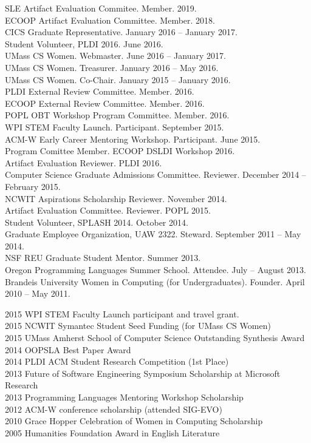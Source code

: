\documentclass[10pt]{article}
\newcommand{\cvsec}[2]{
    \begin{tcolorbox}[width=\textwidth, breakable, title={#1}]
        #2
    \end{tcolorbox}
    \vspace{10pt}
}
\begin{document}
\cvsec{Professional Activities and Service}{
  SLE Artifact Evaluation Commitee. Member. 2019.\\
  ECOOP Artifact Evaluation Committee. Member. 2018.\\
  CICS Graduate Representative. January 2016 -- January 2017.\\
  Student Volunteer, PLDI 2016. June 2016. \\
  UMass CS Women. Webmaster. June 2016 -- January 2017.\\
  UMass CS Women. Treasurer. January 2016 -- May 2016.\\
  UMass CS Women. Co-Chair. January 2015 -- January 2016.\\
  PLDI External Review Committee.  Member.  2016.\\
  ECOOP External Review Committee.  Member.  2016.\\
  POPL OBT Workshop Program Committee.  Member.  2016.\\
  WPI STEM Faculty Launch.  Participant.  September 2015.\\
  ACM-W Early Career Mentoring Workshop.  Participant.  June 2015.\\
  Program Comittee Member. ECOOP DSLDI Workshop 2016. \\
  Artifact Evaluation Reviewer. PLDI 2016. \\
  Computer Science Graduate Admissions Committee. Reviewer. December 2014 -- February 2015.\\
  NCWIT Aspirations Scholarship Reviewer. November 2014. \\
  Artifact Evaluation Committee. Reviewer. POPL 2015.\\
  Student Volunteer, SPLASH 2014. October 2014.\\
  Graduate Employee Organization, UAW 2322. Steward. September 2011 -- May 2014.\\
  NSF REU Graduate Student Mentor. Summer 2013.\\
  Oregon Programming Languages Summer School. Attendee. July -- August 2013.	\\
  Brandeis University Women in Computing (for Undergraduates). Founder. April 2010 -- May 2011. 
}


\cvsec{Honors, Scholarships, and Awards}{
  2015 WPI STEM Faculty Launch participant and travel grant.\\
  2015 NCWIT Symantec Student Seed Funding (for UMass CS Women)\\
  2015 UMass Amherst School of Computer Science Outstanding Synthesis Award\\
  2014 OOPSLA Best Paper Award\\
  2014 PLDI ACM Student Research Competition (1st Place)\\
  2013 Future of Software Engineering Symposium Scholarship at Microsoft Research\\
  2013 Programming Languages Mentoring Workshop Scholarship\\
  2012 ACM-W conference scholarship (attended SIG-EVO)\\
  2010 Grace Hopper Celebration of Women in Computing Scholarship\\
  2005 Humanities Foundation Award in English Literature\\
}
\end{document}
